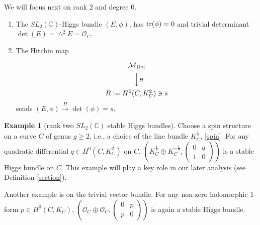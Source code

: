 \documentclass[oneside, 11pt]{amsart}
\theoremstyle{definition}
\newtheorem{ex}{Example}[section]
\numberwithin{equation}{subsection}
\def\tr{{\text{\rm{tr}}}}
\def\Dol{{\text{\rm{Dol}}}}
\begin{document}
We will focus next on rank $2$ and degree $0$.

\begin{enumerate}

\item The $SL_{2}(\mathbb{C})$-Higgs bundle $(E, \phi)$, has $\tr(\phi)=0$ and trivial determinant\\
 $\det(E)=\wedge^2 E=\mathcal{O}_C$.
\item The Hitchin map 

\vskip-0.2in
$$
\begin{CD}
\mathcal{M}_{\Dol}
\\
@VV{H}V
\\
B:=H^0(C, K_{C}^2)\ni s
\end{CD}
$$
sends $(E,\phi)\stackrel{H}{\rightarrow}\det(\phi)=s.$

\end{enumerate}


\begin{ex}[rank two $SL_{2}(\mathbb{C})$ stable  Higgs bundles] Choose a spin structure on 
a curve $C$ of genus $g\ge 2$, i.e., a choice of the line bundle $K_C^{\frac{1}{2}}$, \eqref{spin}. For any quadratic differential $q\in H^0(C, K_{C}^2)$  on $C$, $\left(K_C^{\frac{1}{2}}\oplus K_C^{-\frac{1}{2}}, 
\begin{pmatrix}
0&q\\ 1& 0
\end{pmatrix}\right)$
 is a  stable Higgs bundle on $C$. This example will play a key role in our later analysis (see Definition \eqref{section}). 
 
 Another example is on the  trivial
   vector bundle. For 
   any non-zero holomorphic $1$-form $p\in H^0(C,K_C)$, 
    $\left(\mathcal{O}_C\oplus \mathcal{O}_C, \begin{pmatrix}
0&p\\ p& 0
\end{pmatrix}\right)$ is again a stable Higgs bundle.
\end{ex}
\end{document}
